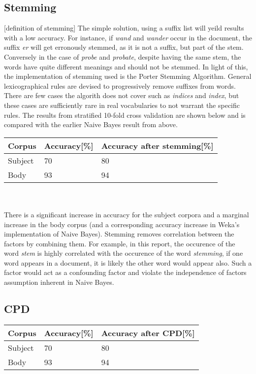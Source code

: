 \documentclass[12pt]{article}
\begin{document}
\subsection{Stemming}
[definition of stemming] The simple solution, using a suffix list will yeild results with a low accuracy. For instance, if \emph{wand} and \emph{wander} occur in the document, the suffix \emph{er} will get erronously stemmed, as it is not a suffix, but part of the stem. Conversely in the case of \emph{probe} and \emph{probate}, despite having the same stem, the words have quite different meanings and should not be stemmed. In light of this, the implementation of stemming used is the Porter Stemming Algorithm. General lexicographical rules are devised to progressively remove suffixes from words. \\
There are few cases the algorith does not cover such as \emph{indices} and \emph{index}, but these cases are sufficiently rare in real vocabularies to not warrant the specific rules. The results from stratified 10-fold cross validation are shown below and is compared with the earlier Naive Bayes result from above.\\

\begin{tabular}{ | l | l | l | }
\hline
Corpus & Accuracy[\%] & Accuracy after stemming[\%]\\ \hline
Subject & 70 & 80  \\ \hline
Body & 93 & 94 \\ \hline
\end{tabular} \\\\

There is a significant increase in accuracy for the subject corpora and a marginal increase in the body corpus (and a corresponding accuracy increase in Weka's implementation of Naive Bayes). Stemming removes correlation between the factors by combining them. For example, in this report, the occurence of the word \emph{stem} is highly correlated with the occurence of the word \emph{stemming}, if one word appears in a document, it is likely the other word would appear also. Such a factor would act as a confounding factor and violate the independence of factors assumption inherent in Naive Bayes.

\subsection{CPD}
\begin{tabular}{ | l | l | l | }
\hline
Corpus & Accuracy[\%] & Accuracy after CPD[\%]\\ \hline
Subject & 70 & 80  \\ \hline
Body & 93 & 94 \\ \hline
\end{tabular} \\\\
\end{document}
